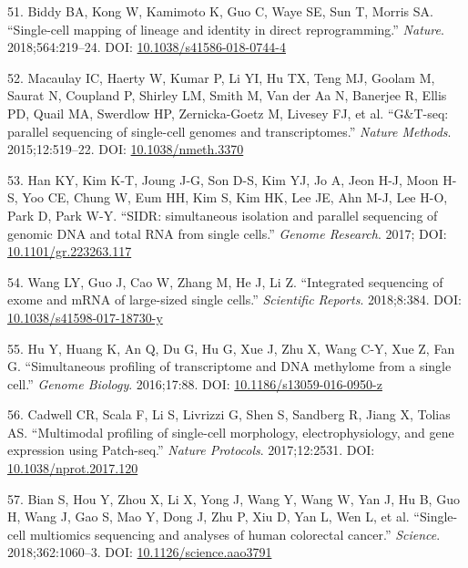 \documentclass[11pt,a4paper,titlepage,twoside,openright]{style/unimelbthesis}
\theoremstyle{definition}
\theoremstyle{definition}
\theoremstyle{definition}
\theoremstyle{remark}
\begin{document}
\begin{mainmatter}
\leavevmode\hypertarget{ref-Biddy2018-uz}{}%
51. Biddy BA, Kong W, Kamimoto K, Guo C, Waye SE, Sun T, Morris SA. ``Single-cell mapping of lineage and identity in direct reprogramming.'' \emph{Nature}. 2018;564:219--24. DOI: \href{https://doi.org/10.1038/s41586-018-0744-4}{10.1038/s41586-018-0744-4}

\leavevmode\hypertarget{ref-Macaulay2015-dp}{}%
52. Macaulay IC, Haerty W, Kumar P, Li YI, Hu TX, Teng MJ, Goolam M, Saurat N, Coupland P, Shirley LM, Smith M, Van der Aa N, Banerjee R, Ellis PD, Quail MA, Swerdlow HP, Zernicka-Goetz M, Livesey FJ, et al. ``G\&T-seq: parallel sequencing of single-cell genomes and transcriptomes.'' \emph{Nature Methods}. 2015;12:519--22. DOI: \href{https://doi.org/10.1038/nmeth.3370}{10.1038/nmeth.3370}

\leavevmode\hypertarget{ref-Han2017-sc}{}%
53. Han KY, Kim K-T, Joung J-G, Son D-S, Kim YJ, Jo A, Jeon H-J, Moon H-S, Yoo CE, Chung W, Eum HH, Kim S, Kim HK, Lee JE, Ahn M-J, Lee H-O, Park D, Park W-Y. ``SIDR: simultaneous isolation and parallel sequencing of genomic DNA and total RNA from single cells.'' \emph{Genome Research}. 2017; DOI: \href{https://doi.org/10.1101/gr.223263.117}{10.1101/gr.223263.117}

\leavevmode\hypertarget{ref-Wang2018-xp}{}%
54. Wang LY, Guo J, Cao W, Zhang M, He J, Li Z. ``Integrated sequencing of exome and mRNA of large-sized single cells.'' \emph{Scientific Reports}. 2018;8:384. DOI: \href{https://doi.org/10.1038/s41598-017-18730-y}{10.1038/s41598-017-18730-y}

\leavevmode\hypertarget{ref-Hu2016-il}{}%
55. Hu Y, Huang K, An Q, Du G, Hu G, Xue J, Zhu X, Wang C-Y, Xue Z, Fan G. ``Simultaneous profiling of transcriptome and DNA methylome from a single cell.'' \emph{Genome Biology}. 2016;17:88. DOI: \href{https://doi.org/10.1186/s13059-016-0950-z}{10.1186/s13059-016-0950-z}

\leavevmode\hypertarget{ref-Cadwell2017-wu}{}%
56. Cadwell CR, Scala F, Li S, Livrizzi G, Shen S, Sandberg R, Jiang X, Tolias AS. ``Multimodal profiling of single-cell morphology, electrophysiology, and gene expression using Patch-seq.'' \emph{Nature Protocols}. 2017;12:2531. DOI: \href{https://doi.org/10.1038/nprot.2017.120}{10.1038/nprot.2017.120}

\leavevmode\hypertarget{ref-Bian2018-rt}{}%
57. Bian S, Hou Y, Zhou X, Li X, Yong J, Wang Y, Wang W, Yan J, Hu B, Guo H, Wang J, Gao S, Mao Y, Dong J, Zhu P, Xiu D, Yan L, Wen L, et al. ``Single-cell multiomics sequencing and analyses of human colorectal cancer.'' \emph{Science}. 2018;362:1060--3. DOI: \href{https://doi.org/10.1126/science.aao3791}{10.1126/science.aao3791}


\end{mainmatter}
\end{document}
